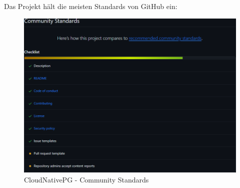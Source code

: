 \begin{flushleft}
    Das Projekt hält die meisten Standards von GitHub ein:
    \begin{figure}[H]
        \centering
        \includegraphics[width=0.75\linewidth]{source/implementation/evaluation/postgresql_ha_solutions/insights/cloudnativepg/community_standards}
        \caption{CloudNativePG - Community Standards}
        \label{fig:community_standards_cloudnativepg}
    \end{figure}


\end{flushleft}
